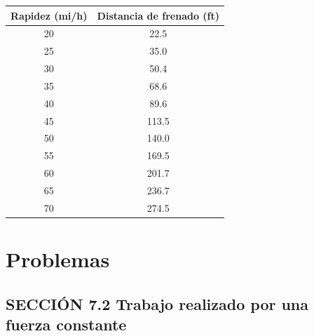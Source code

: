 \documentclass[11pt,a4paper]{article}
\begin{document}
\begin{itemize}
    \begin{center}
    \begin{tabular}{cc}
    \hline
    \textbf{Rapidez (mi/h)} & \textbf{Distancia de frenado (ft)} \\
    \hline
    20 & 22.5 \\
    25 & 35.0 \\
    30 & 50.4 \\
    35 & 68.6 \\
    40 & 89.6 \\
    45 & 113.5 \\
    50 & 140.0 \\
    55 & 169.5 \\
    60 & 201.7 \\
    65 & 236.7 \\
    70 & 274.5 \\
    \hline
    \end{tabular}
    \end{center}
\end{itemize}

\newpage

\section*{Problemas}

\subsection*{SECCIÓN 7.2 Trabajo realizado por una fuerza constante}
\end{document}
